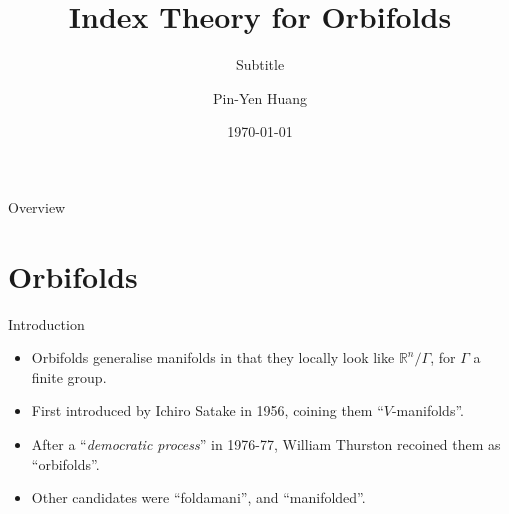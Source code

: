 \documentclass[aspectratio=169,xcolor=dvipsnames]{beamer}
\title[short title]{Index Theory for Orbifolds} %
\subtitle{Subtitle}
\author[Pin-Yen] {Pin-Yen Huang}
\institute[NTU] %
{
    Department of Computer Science and Information Engineering \\
    National Taiwan University %
}
\date{\today} %
\newcommand{\RR}{\mathbb{R}}
\begin{document}
\begin{frame}
    \titlepage
\end{frame}

\begin{frame}{Overview}
    \tableofcontents
\end{frame}

\section{Orbifolds}

\begin{frame}{Introduction}
    \begin{itemize}
        \item Orbifolds generalise manifolds in that they locally look like $\RR^{n}/\Gamma$, for $\Gamma$ a finite group.
        \item First introduced by Ichiro Satake in 1956, coining them ``$V$-manifolds''.
        \item After a ``\emph{democratic process}'' in 1976-77, William Thurston recoined them as ``orbifolds''.
        \item Other candidates were ``foldamani'', and ``manifolded''.
    \end{itemize}    
\end{frame}
\end{document}
